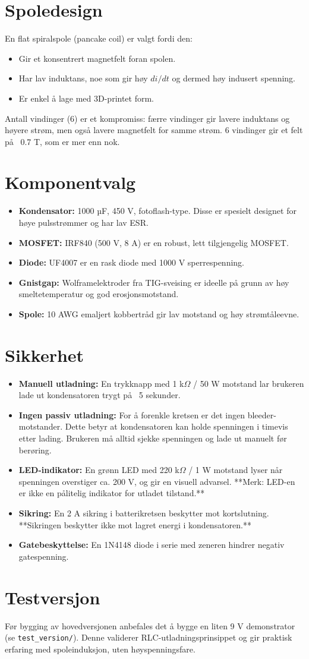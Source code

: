 \documentclass{article}
\begin{document}
\section{Spoledesign}
En flat spiralspole (pancake coil) er valgt fordi den:
\begin{itemize}
\item Gir et konsentrert magnetfelt foran spolen.
\item Har lav induktans, noe som gir høy $di/dt$ og dermed høy indusert spenning.
\item Er enkel å lage med 3D-printet form.
\end{itemize}
Antall vindinger (6) er et kompromiss: færre vindinger gir lavere induktans og høyere strøm, men også lavere magnetfelt for samme strøm. 6 vindinger gir et felt på ~0.7 T, som er mer enn nok.

\section{Komponentvalg}
\begin{itemize}
\item \textbf{Kondensator:} 1000 µF, 450 V, fotoflash-type. Disse er spesielt designet for høye pulsstrømmer og har lav ESR.
\item \textbf{MOSFET:} IRF840 (500 V, 8 A) er en robust, lett tilgjengelig MOSFET.
\item \textbf{Diode:} UF4007 er en rask diode med 1000 V sperrespenning.
\item \textbf{Gnistgap:} Wolframelektroder fra TIG-sveising er ideelle på grunn av høy smeltetemperatur og god erosjonsmotstand.
\item \textbf{Spole:} 10 AWG emaljert kobbertråd gir lav motstand og høy strømtåleevne.
\end{itemize}

\section{Sikkerhet}
\begin{itemize}
\item \textbf{Manuell utladning:} En trykknapp med 1 k$\Omega$ / 50 W motstand lar brukeren lade ut kondensatoren trygt på ~5 sekunder.
\item \textbf{Ingen passiv utladning:} For å forenkle kretsen er det ingen bleeder-motstander. Dette betyr at kondensatoren kan holde spenningen i timevis etter lading. Brukeren må alltid sjekke spenningen og lade ut manuelt før berøring.
\item \textbf{LED-indikator:} En grønn LED med 220 k$\Omega$ / 1 W motstand lyser når spenningen overstiger ca. 200 V, og gir en visuell advarsel. **Merk: LED-en er ikke en pålitelig indikator for utladet tilstand.**
\item \textbf{Sikring:} En 2 A sikring i batterikretsen beskytter mot kortslutning. **Sikringen beskytter ikke mot lagret energi i kondensatoren.**
\item \textbf{Gatebeskyttelse:} En 1N4148 diode i serie med zeneren hindrer negativ gatespenning.
\end{itemize}

\section{Testversjon}
Før bygging av hovedversjonen anbefales det å bygge en liten 9 V demonstrator (se \texttt{test\_version/}). Denne validerer RLC-utladningsprinsippet og gir praktisk erfaring med spoleinduksjon, uten høyspenningsfare.
\end{document}
